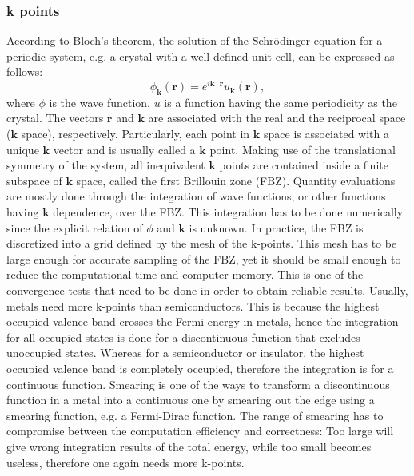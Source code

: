 \subsubsection{k points}
According to Bloch's theorem, the solution of the Schr\"{o}dinger equation for a periodic system, e.g. a crystal with a well-defined unit cell, can be expressed as follows:
\begin{equation}\label{imp:bloch}
\phi_{\mathbf{k}}(\mathbf{r})=e^{i\mathbf{k}\cdot\mathbf{r}}u_{\mathbf{k}}(\mathbf{r}),
\end{equation}
where $\phi$ is the wave function, $u$ is a function having the same periodicity as the crystal. The vectors $\mathbf{r}$ and $\mathbf{k}$ are associated with the real and the reciprocal space ($\mathbf{k}$ space), respectively. Particularly, each point in $\mathbf{k}$ space is associated with a unique $\mathbf{k}$ vector and is usually called a $\mathbf{k}$ point. Making use of the translational symmetry of the system, all inequivalent $\mathbf{k}$ points are contained inside a finite subspace of $\mathbf{k}$ space, called the first Brillouin zone (FBZ). Quantity evaluations are mostly done through the integration of wave functions, or other functions having $\mathbf{k}$ dependence, over the FBZ. This integration has to be done numerically since the explicit relation of $\phi$ and $\mathbf{k}$ is unknown. In practice, the FBZ is discretized into a grid defined by the mesh of the k-points. This mesh has to be large enough for accurate sampling of the FBZ, yet it should be small enough to reduce the computational time and computer memory. This is one of the convergence tests that need to be done in order to obtain reliable results. Usually, metals need more k-points than semiconductors. This is because the highest occupied valence band crosses the Fermi energy in metals, hence the integration for all occupied states is done for a discontinuous function that excludes unoccupied states.  Whereas for a semiconductor or insulator, the highest occupied valence band is completely occupied, therefore the integration is for a continuous function. Smearing is one of the ways to transform a discontinuous function in a metal into a continuous one by smearing out the edge using a smearing function, e.g. a Fermi-Dirac function. The range of smearing has to compromise between the computation efficiency and correctness: Too large will give wrong integration results of the total energy, while too small becomes useless, therefore one again needs more k-points.
